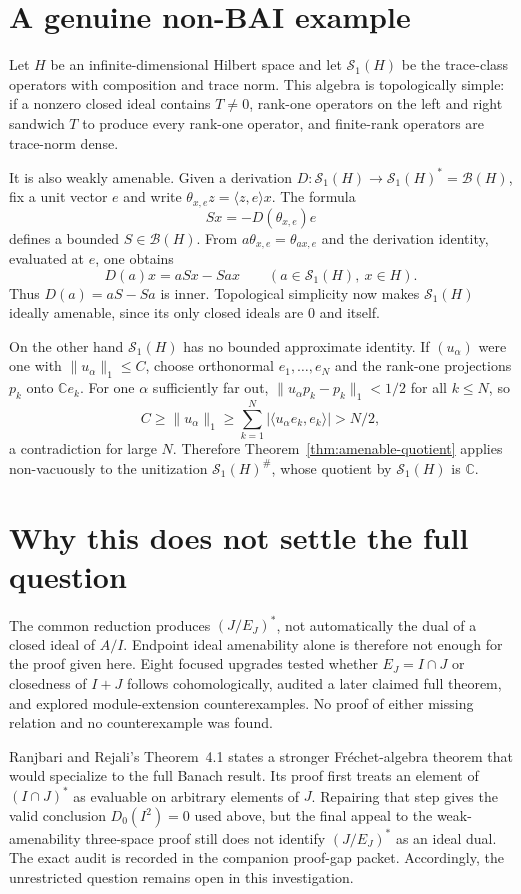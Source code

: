 \documentclass[11pt]{article}
\begin{document}
\section{A genuine non-BAI example}
Let $H$ be an infinite-dimensional Hilbert space and let
$\mathcal S_1(H)$ be the trace-class operators with composition and trace
norm.  This algebra is topologically simple: if a nonzero closed ideal
contains $T\ne0$, rank-one operators on the left and right sandwich $T$ to
produce every rank-one operator, and finite-rank operators are trace-norm
dense.

It is also weakly amenable.  Given a derivation
$D:\mathcal S_1(H)\to\mathcal S_1(H)^*=\mathcal B(H)$, fix a unit vector
$e$ and write $\theta_{x,e}z=\langle z,e\rangle x$.  The formula
\[
 Sx=-D(\theta_{x,e})e
\]
defines a bounded $S\in\mathcal B(H)$.  From
$a\theta_{x,e}=\theta_{ax,e}$ and the derivation identity, evaluated at
$e$, one obtains
\[
 D(a)x=aSx-Sax \qquad(a\in\mathcal S_1(H),\ x\in H).
\]
Thus $D(a)=aS-Sa$ is inner.  Topological simplicity now makes
$\mathcal S_1(H)$ ideally amenable, since its only closed ideals are $0$
and itself.

On the other hand $\mathcal S_1(H)$ has no bounded approximate identity.
If $(u_\alpha)$ were one with $\|u_\alpha\|_1\le C$, choose orthonormal
$e_1,\dots,e_N$ and the rank-one projections $p_k$ onto $\mathbb Ce_k$.
For one $\alpha$ sufficiently far out,
$\|u_\alpha p_k-p_k\|_1<1/2$ for all $k\le N$, so
\[
 C\ge\|u_\alpha\|_1
 \ge \sum_{k=1}^N |\langle u_\alpha e_k,e_k\rangle|
 >N/2,
\]
a contradiction for large $N$.  Therefore Theorem~\ref{thm:amenable-quotient}
applies non-vacuously to the unitization
$\mathcal S_1(H)^\#$, whose quotient by $\mathcal S_1(H)$ is $\mathbb C$.

\section{Why this does not settle the full question}
The common reduction produces $(J/E_J)^*$, not automatically the dual of a
closed ideal of $A/I$.  Endpoint ideal amenability alone is therefore not
enough for the proof given here.  Eight focused upgrades tested whether
$E_J=I\cap J$ or closedness of $I+J$ follows cohomologically, audited a
later claimed full theorem, and explored module-extension counterexamples.
No proof of either missing relation and no counterexample was found.

Ranjbari and Rejali's Theorem~4.1 \cite{ranjbari-rejali} states a stronger
Fr\'echet-algebra theorem that would specialize to the full Banach result.
Its proof first treats an element of $(I\cap J)^*$ as evaluable on arbitrary
elements of $J$.  Repairing that step gives the valid conclusion
$D_0(I^2)=0$ used above, but the final appeal to the weak-amenability
three-space proof still does not identify $(J/E_J)^*$ as an ideal dual.
The exact audit is recorded in the companion proof-gap packet.  Accordingly,
the unrestricted question remains open in this investigation.
\end{document}
